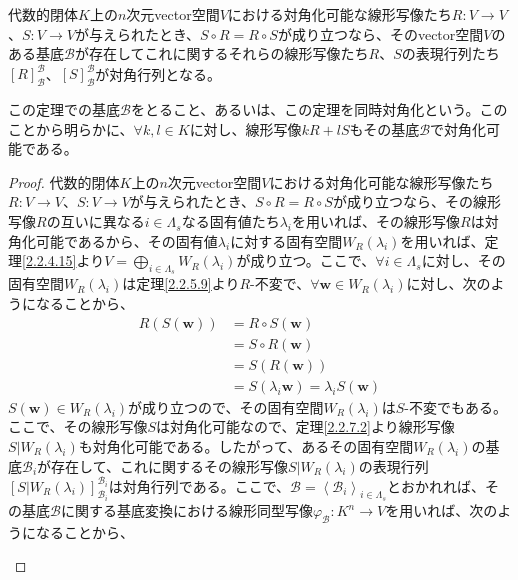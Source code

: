 \documentclass[dvipdfmx]{jsarticle}
\begin{document}
\begin{thm}[同時対角化]\label{2.2.7.3}
代数的閉体$K$上の$n$次元vector空間$V$における対角化可能な線形写像たち$R:V \rightarrow V$、$S:V \rightarrow V$が与えられたとき、$S \circ R = R \circ S$が成り立つなら、そのvector空間$V$のある基底$\mathcal{B}$が存在してこれに関するそれらの線形写像たち$R$、$S$の表現行列たち$[R]_{\mathcal{B}}^{\mathcal{B}}$、$[S]_{\mathcal{B}}^{\mathcal{B}}$が対角行列となる。\par
この定理での基底$\mathcal{B}$をとること、あるいは、この定理を同時対角化という。このことから明らかに、$\forall k,l \in K$に対し、線形写像$kR + lS$もその基底$\mathcal{B}$で対角化可能である。
\end{thm}
\begin{proof}
代数的閉体$K$上の$n$次元vector空間$V$における対角化可能な線形写像たち$R:V \rightarrow V$、$S:V \rightarrow V$が与えられたとき、$S \circ R = R \circ S$が成り立つなら、その線形写像$R$の互いに異なる$i \in \varLambda_{s}$なる固有値たち$\lambda_{i}$を用いれば、その線形写像$R$は対角化可能であるから、その固有値$\lambda_{i}$に対する固有空間$W_{R}\left( \lambda_{i} \right)$を用いれば、定理\ref{2.2.4.15}より$V = \bigoplus_{i \in \varLambda_{s}} {W_{R}\left( \lambda_{i} \right)}$が成り立つ。ここで、$\forall i \in \varLambda_{s}$に対し、その固有空間$W_{R}\left( \lambda_{i} \right)$は定理\ref{2.2.5.9}より$R$-不変で、$\forall\mathbf{w} \in W_{R}\left( \lambda_{i} \right)$に対し、次のようになることから、
\begin{align*}
R\left( S\left( \mathbf{w} \right) \right) &= R \circ S\left( \mathbf{w} \right) \\
&= S \circ R\left( \mathbf{w} \right) \\
&= S\left( R\left( \mathbf{w} \right) \right) \\
&= S\left( \lambda_{i}\mathbf{w} \right) = \lambda_{i}S\left( \mathbf{w} \right)
\end{align*}
$S\left( \mathbf{w} \right) \in W_{R}\left( \lambda_{i} \right)$が成り立つので、その固有空間$W_{R}\left( \lambda_{i} \right)$は$S$-不変でもある。ここで、その線形写像$S$は対角化可能なので、定理\ref{2.2.7.2}より線形写像$S|W_{R}\left( \lambda_{i} \right)$も対角化可能である。したがって、あるその固有空間$W_{R}\left( \lambda_{i} \right)$の基底$\mathcal{B}_{i}$が存在して、これに関するその線形写像$S|W_{R}\left( \lambda_{i} \right)$の表現行列$\left[S|W_{R}\left( \lambda_{i} \right) \right]_{\mathcal{B}_{i}}^{\mathcal{B}_{i}}$は対角行列である。ここで、$\mathcal{B} =\left\langle \mathcal{B}_{i} \right\rangle_{i \in \varLambda_{s}}$とおかれれば、その基底$\mathcal{B}$に関する基底変換における線形同型写像$\varphi_{\mathcal{B}}:K^{n} \rightarrow V$を用いれば、次のようになることから、
\begin{center}
  \begin{tikzpicture}[auto]


\end{tikzpicture}
\end{center}
\end{proof}
\end{document}
